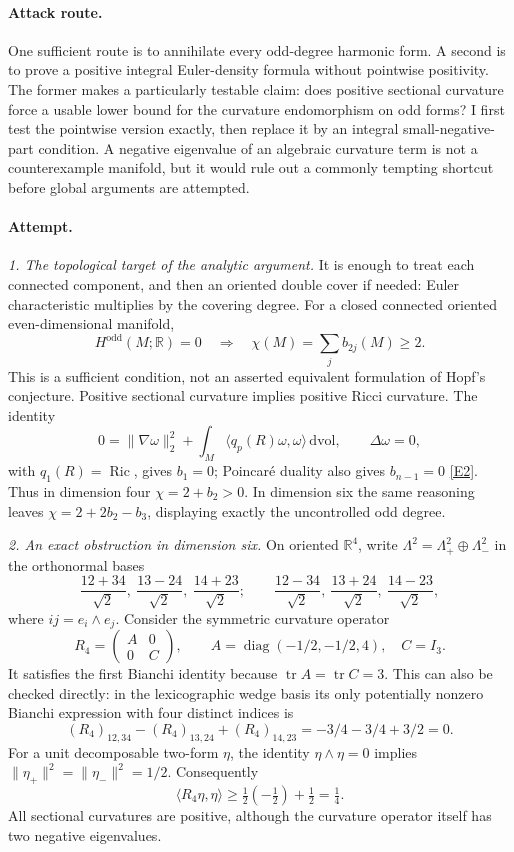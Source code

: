 \documentclass[11pt,a4paper]{article}
\newcommand{\R}{\mathbb{R}}
\newcommand{\eref}[2]{\hyperlink{extra:#1:#2}{[E#2]}}
\begin{document}
\paragraph{Attack route.}
One sufficient route is to annihilate every odd-degree harmonic form. A second
is to prove a positive integral Euler-density formula without pointwise
positivity. The former makes a particularly testable claim: does positive
sectional curvature force a usable lower bound for the curvature endomorphism
on odd forms? I first test the pointwise version exactly, then replace it by
an integral small-negative-part condition. A negative eigenvalue of an
algebraic curvature term is not a counterexample manifold, but it would rule
out a commonly tempting shortcut before global arguments are attempted.

\paragraph{Attempt.}
\textit{1. The topological target of the analytic argument.}
It is enough to treat each connected component, and then an oriented double
cover if needed: Euler characteristic multiplies by the covering degree.
For a closed connected oriented even-dimensional manifold,
\[
 H^{\mathrm{odd}}(M;\R)=0\quad\Longrightarrow\quad
 \chi(M)=\sum_j b_{2j}(M)\ge2.
\]
This is a sufficient condition, not an asserted equivalent formulation of
Hopf's conjecture. Positive sectional curvature implies positive Ricci
curvature. The identity
\[
 0=\|\nabla\omega\|_2^2+
   \int_M\langle q_p(R)\omega,\omega\rangle\,\mathrm{dvol},
 \qquad \Delta\omega=0,
\]
with $q_1(R)=\operatorname{Ric}$, gives $b_1=0$; Poincar\'e duality also gives
$b_{n-1}=0$ \eref{211}{2}. Thus in dimension four
$\chi=2+b_2>0$. In dimension six the same reasoning leaves
$\chi=2+2b_2-b_3$, displaying exactly the uncontrolled odd degree.

\textit{2. An exact obstruction in dimension six.}
On oriented $\R^4$, write $\Lambda^2=\Lambda^2_+\oplus\Lambda^2_-$ in the
orthonormal bases
\[
 \frac{12+34}{\sqrt2},\ \frac{13-24}{\sqrt2},\
 \frac{14+23}{\sqrt2};\qquad
 \frac{12-34}{\sqrt2},\ \frac{13+24}{\sqrt2},\
 \frac{14-23}{\sqrt2},
\]
where $ij=e_i\wedge e_j$. Consider the symmetric curvature operator
\[
 R_4=\begin{pmatrix}A&0\\0&C\end{pmatrix},\qquad
 A=\operatorname{diag}(-1/2,-1/2,4),\quad C=I_3.
\]
It satisfies the first Bianchi identity because $\operatorname{tr}A=
\operatorname{tr}C=3$. This can also be checked directly: in the lexicographic
wedge basis its only potentially nonzero Bianchi expression with four
distinct indices is
\[
 (R_4)_{12,34}-(R_4)_{13,24}+(R_4)_{14,23}
 =-3/4-3/4+3/2=0.
\]
For a unit decomposable two-form $\eta$, the identity
$\eta\wedge\eta=0$ implies $\|\eta_+\|^2=\|\eta_-\|^2=1/2$.
Consequently
\[
 \langle R_4\eta,\eta\rangle\ge\tfrac12(-\tfrac12)+\tfrac12=\tfrac14.
\]
All sectional curvatures are positive, although the curvature operator itself
has two negative eigenvalues.
\end{document}
